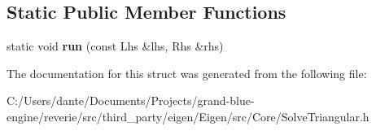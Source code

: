 \subsection*{Static Public Member Functions}
\begin{DoxyCompactItemize}
\item 
\mbox{\label{struct_eigen_1_1internal_1_1triangular__solver__selector_3_01_lhs_00_01_rhs_00_01_side_00_01_modf7016aec58372d55e43776676d69f5fb_ace16c68927cde184c0d5703c58f3780a}} 
static void {\bfseries run} (const Lhs \&lhs, Rhs \&rhs)
\end{DoxyCompactItemize}


The documentation for this struct was generated from the following file\+:\begin{DoxyCompactItemize}
\item 
C\+:/\+Users/dante/\+Documents/\+Projects/grand-\/blue-\/engine/reverie/src/third\+\_\+party/eigen/\+Eigen/src/\+Core/Solve\+Triangular.\+h\end{DoxyCompactItemize}
